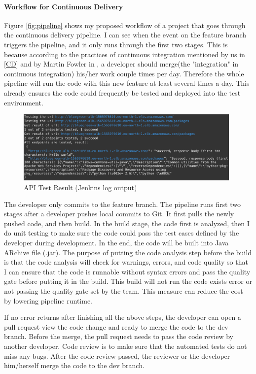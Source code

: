 \paragraph[]{Workflow for Continuous Delivery}
\label{workflow}
Figure \ref{fig:pipeline} shows my proposed workflow of a project that goes through the continuous delivery pipeline.
I can see when the event on the feature branch triggers the pipeline, and it only runs through the first two stages. This is because according to the practices of continuous integration mentioned by us in \ref{CD} and by Martin Fowler in \cite{fowler2006continuous}, a developer should merge(the "integration" in continuous integration) his/her work couple times per day. Therefore the whole pipeline will run the code with this new feature at least several times a day. This already ensures the code could frequently be tested and deployed into the test environment.
\begin{figure}[!h]
     \centering
     \includegraphics[width=0.98\textwidth]{pics/test_result.png}
     \caption{API Test Result (Jenkins log output)}
     \label{fig:test-result}
    \end{figure}
\par
The developer only commits to the feature branch. The pipeline runs first two stages after a developer pushes local commits to Git. It first pulls the newly pushed code, and then build. In the build stage, the code first is analyzed, then I do unit testing to make sure the code could pass the test cases defined by the developer during development. In the end, the code will be built into Java ARchive file (.jar). The purpose of putting the code analysis step before the build is that the code analysis will check for warnings, errors, and code quality so that I can ensure that the code is runnable without syntax errors and pass the quality gate before putting it in the build. This build will not run the code exists error or not passing the quality gate set by the team. This measure can reduce the cost by lowering pipeline runtime. 
\par
If no error returns after finishing all the above steps, the developer can open a pull request view the code change and ready to merge the code to the dev branch. Before the merge, the pull request needs to pass the code review by another developer. Code review is to make sure that the automated tests do not miss any bugs. After the code review passed, the reviewer or the developer him/herself merge the code to the dev branch.  
